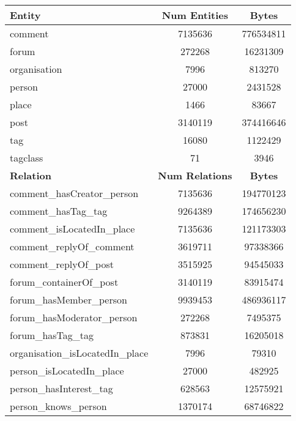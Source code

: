 \begin{table}[H]
    \centering
    \begin{tabular} {| l | c | c |}
        \hline
        \textbf{Entity} & \textbf{Num Entities} & \textbf{Bytes} \\
        \hline
        \hline
        comment & 7135636 & 776534811 \\
        \hline
        forum & 272268 & 16231309 \\
        \hline
        organisation & 7996 & 813270 \\
        \hline
        person & 27000 & 2431528 \\
        \hline
        place & 1466 & 83667 \\
        \hline
        post & 3140119 & 374416646 \\
        \hline
        tag & 16080 & 1122429 \\
        \hline
        tagclass & 71 & 3946 \\
        \hline
        \hline
        \textbf{Relation} & \textbf{Num Relations} & \textbf{Bytes} \\
        \hline
        \hline
        comment\_hasCreator\_person & 7135636 & 194770123 \\
        \hline
        comment\_hasTag\_tag & 9264389 & 174656230 \\
        \hline
        comment\_isLocatedIn\_place & 7135636 & 121173303 \\
        \hline
        comment\_replyOf\_comment & 3619711 & 97338366 \\
        \hline
        comment\_replyOf\_post & 3515925 & 94545033 \\
        \hline
        forum\_containerOf\_post & 3140119 & 83915474 \\
        \hline
        forum\_hasMember\_person & 9939453 & 486936117 \\
        \hline
        forum\_hasModerator\_person & 272268 & 7495375 \\
        \hline
        forum\_hasTag\_tag & 873831 & 16205018 \\
        \hline
        organisation\_isLocatedIn\_place & 7996 & 79310 \\
        \hline
        person\_isLocatedIn\_place & 27000 & 482925 \\
        \hline
        person\_hasInterest\_tag & 628563 & 12575921 \\
        \hline
        person\_knows\_person & 1370174 & 68746822 \\

\end{tabular}
\end{table}
